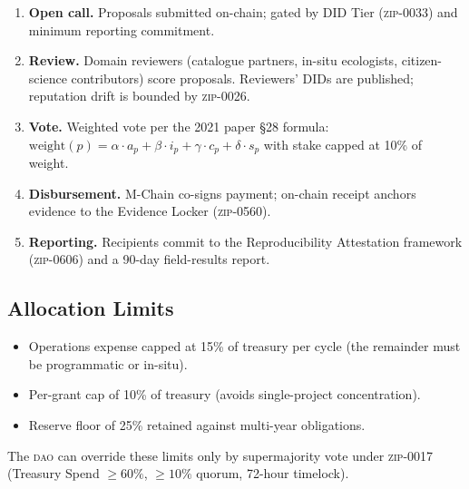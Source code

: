 \begin{enumerate}[nosep,leftmargin=1.4em]
\item \textbf{Open call.} Proposals submitted on-chain; gated by DID
  Tier (\textsc{zip-0033}) and minimum reporting commitment.
\item \textbf{Review.} Domain reviewers (catalogue partners, in-situ
  ecologists, citizen-science contributors) score proposals.
  Reviewers' DIDs are published; reputation drift is bounded by
  \textsc{zip-0026}.
\item \textbf{Vote.} Weighted vote per the 2021 paper \S28 formula:
  $\text{weight}(p) = \alpha \cdot a_p + \beta \cdot i_p + \gamma \cdot c_p + \delta \cdot s_p$
  with stake capped at 10\% of weight.
\item \textbf{Disbursement.} M-Chain co-signs payment; on-chain
  receipt anchors evidence to the Evidence Locker
  (\textsc{zip-0560}).
\item \textbf{Reporting.} Recipients commit to the Reproducibility
  Attestation framework (\textsc{zip-0606}) and a 90-day field-results
  report.
\end{enumerate}

\subsection{Allocation Limits}

\begin{itemize}[nosep,leftmargin=1.2em]
\item Operations expense capped at 15\% of treasury per cycle (the
  remainder must be programmatic or in-situ).
\item Per-grant cap of 10\% of treasury (avoids single-project
  concentration).
\item Reserve floor of 25\% retained against multi-year obligations.
\end{itemize}

The \textsc{dao}{} can override these limits only by supermajority vote
under \textsc{zip-0017} (Treasury Spend $\geq 60\%$, $\geq 10\%$
quorum, 72-hour timelock).
